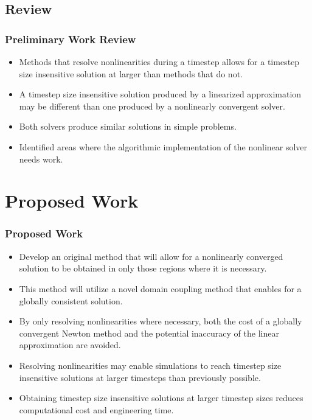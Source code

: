 \documentclass[compress,xcolor=table]{beamer}
\begin{document}
\subsection[Review]{Review}
\begin{frame}
\frametitle{Preliminary Work Review}

\begin{itemize}
\item{Methods that resolve nonlinearities during a timestep allows for a timestep size insensitive solution at larger \dtmax{} than methods that do not.}
\item{A timestep size insensitive solution produced by a linearized approximation may be different than one produced by a nonlinearly convergent solver.}
\item{Both solvers produce similar solutions in simple problems.}
\item{Identified areas where the algorithmic implementation of the nonlinear solver needs work.}
\end{itemize}

\end{frame}
\section[Proposed Work]{Proposed Work}
\begin{frame}
\frametitle{Proposed Work}

\begin{itemize}
\item{Develop an original method that will allow for a nonlinearly converged solution to be obtained in only those regions where it is necessary.}
\item{This method will utilize a novel domain coupling method that enables for a globally consistent solution.}
\item{By only resolving nonlinearities where necessary, both the cost of a globally convergent Newton method and the potential inaccuracy of the linear approximation are avoided.}
\item{Resolving nonlinearities may enable simulations to reach timestep size insensitive solutions at larger timesteps than previously possible.}
\item{Obtaining timestep size insensitive solutions at larger timestep sizes reduces computational cost and engineering time.}
\end{itemize}

\end{frame}
\end{document}
